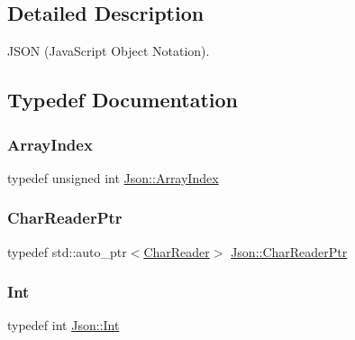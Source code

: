 \subsection{Detailed Description}
J\+S\+ON (Java\+Script Object Notation). 

\subsection{Typedef Documentation}
\mbox{\label{namespaceJson_a8048e741f2177c3b5d9ede4a5b8c53c2_a8048e741f2177c3b5d9ede4a5b8c53c2}} 
\subsubsection{\texorpdfstring{Array\+Index}{ArrayIndex}}
{\footnotesize\ttfamily typedef unsigned int \hyperlink{namespaceJson_a8048e741f2177c3b5d9ede4a5b8c53c2_a8048e741f2177c3b5d9ede4a5b8c53c2}{Json\+::\+Array\+Index}}

\mbox{\label{namespaceJson_a4724efb8d41614b47036cb8b54233837_a4724efb8d41614b47036cb8b54233837}} 
\subsubsection{\texorpdfstring{Char\+Reader\+Ptr}{CharReaderPtr}}
{\footnotesize\ttfamily typedef std\+::auto\+\_\+ptr$<$\hyperlink{classJson_1_1CharReader}{Char\+Reader}$>$ \hyperlink{namespaceJson_a4724efb8d41614b47036cb8b54233837_a4724efb8d41614b47036cb8b54233837}{Json\+::\+Char\+Reader\+Ptr}}

\mbox{\label{namespaceJson_a08122e8005b706d982e48cca1e2119c7_a08122e8005b706d982e48cca1e2119c7}} 
\subsubsection{\texorpdfstring{Int}{Int}}
{\footnotesize\ttfamily typedef int \hyperlink{namespaceJson_a08122e8005b706d982e48cca1e2119c7_a08122e8005b706d982e48cca1e2119c7}{Json\+::\+Int}}

